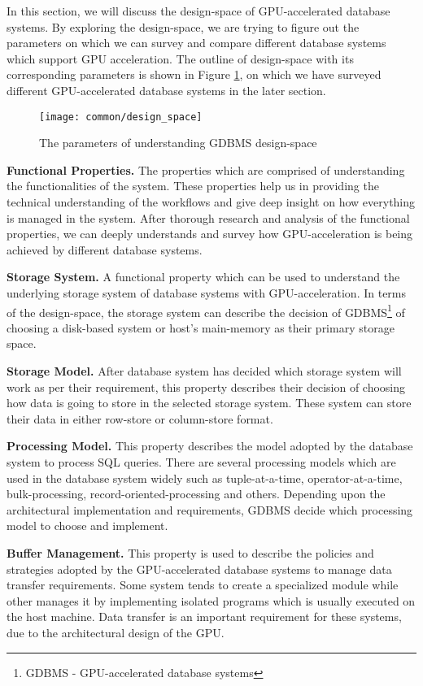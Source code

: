 In this section, we will discuss the design-space of GPU-accelerated database systems. By exploring the design-space, we are trying to figure out the parameters on which we can survey and compare different database systems which support GPU acceleration. The outline of design-space with its corresponding parameters is shown in Figure \ref{fig:gpu_design_space}, on which we have surveyed different GPU-accelerated database systems in the later section.

\begin{figure}[ht]
\centering
\texttt{[image: common/design\_space]}
\caption{The parameters of understanding GDBMS design-space}
\label{fig:gpu_design_space}
\end{figure}

\textbf{Functional Properties.} The properties which are comprised of understanding the functionalities of the system. These properties help us in providing the technical understanding of the workflows and give deep insight on how everything is managed in the system. After thorough research and analysis of the functional properties, we can deeply understands and survey how GPU-acceleration is being achieved by different database systems.

\textbf{Storage System.} A functional property which can be used to understand the underlying storage system of database systems with GPU-acceleration. In terms of the design-space, the storage system can describe the decision of GDBMS\footnote{GDBMS - GPU-accelerated database systems} of choosing a disk-based system or host's main-memory as their primary storage space.

\textbf{Storage Model.} After database system has decided which storage system will work as per their requirement, this property describes their decision of choosing how data is going to store in the selected storage system. These system can store their data in either row-store or column-store format.

\textbf{Processing Model.} This property describes the model adopted by the database system to process SQL queries. There are several processing models which are used in the database system widely such as tuple-at-a-time, operator-at-a-time, bulk-processing, record-oriented-processing and others. Depending upon the architectural implementation and requirements, GDBMS decide which processing model to choose and implement. 

\textbf{Buffer Management.} This property is used to describe the policies and strategies adopted by the GPU-accelerated database systems to manage data transfer requirements. Some system tends to create a specialized module while other manages it by implementing isolated programs which is usually executed on the host machine. Data transfer is an important requirement for these systems, due to the architectural design of the GPU.

